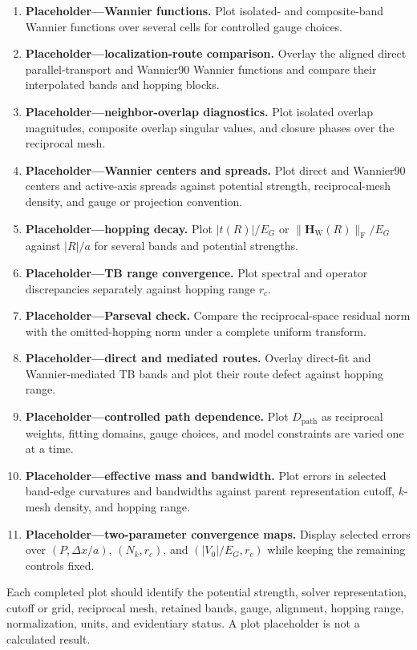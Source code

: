 \begin{enumerate}
    \item \textbf{Placeholder---Wannier functions.} Plot isolated- and
          composite-band Wannier functions over several cells for controlled
          gauge choices.
    \item \textbf{Placeholder---localization-route comparison.} Overlay the
          aligned direct parallel-transport and Wannier90 Wannier functions and
          compare their interpolated bands and hopping blocks.
    \item \textbf{Placeholder---neighbor-overlap diagnostics.} Plot isolated
          overlap magnitudes, composite overlap singular values, and closure
          phases over the reciprocal mesh.
    \item \textbf{Placeholder---Wannier centers and spreads.} Plot direct and
          Wannier90 centers and active-axis spreads against potential strength,
          reciprocal-mesh density, and gauge or projection convention.
    \item \textbf{Placeholder---hopping decay.} Plot $|t(R)|/E_G$ or
          $\lVert\mathbf H_{\mathrm W}(R)\rVert_{\mathrm F}/E_G$ against
          $|R|/a$ for several bands and potential strengths.
    \item \textbf{Placeholder---TB range convergence.} Plot spectral and
          operator discrepancies separately against hopping range $r_c$.
    \item \textbf{Placeholder---Parseval check.} Compare the reciprocal-space
          residual norm with the omitted-hopping norm under a complete uniform
          transform.
    \item \textbf{Placeholder---direct and mediated routes.} Overlay direct-fit
          and Wannier-mediated TB bands and plot their route defect against
          hopping range.
    \item \textbf{Placeholder---controlled path dependence.} Plot
          $D_{\mathrm{path}}$ as reciprocal weights, fitting domains, gauge
          choices, and model constraints are varied one at a time.
    \item \textbf{Placeholder---effective mass and bandwidth.} Plot errors in
          selected band-edge curvatures and bandwidths against parent
          representation cutoff, $k$-mesh density, and hopping range.
    \item \textbf{Placeholder---two-parameter convergence maps.} Display
          selected errors over $(P,\Delta x/a)$, $(N_k,r_c)$, and
          $(|V_0|/E_G,r_c)$ while keeping the remaining controls fixed.
\end{enumerate}
Each completed plot should identify the potential strength, solver
representation, cutoff or grid, reciprocal mesh, retained bands, gauge,
alignment, hopping range, normalization, units, and evidentiary status. A plot
placeholder is not a calculated result.

